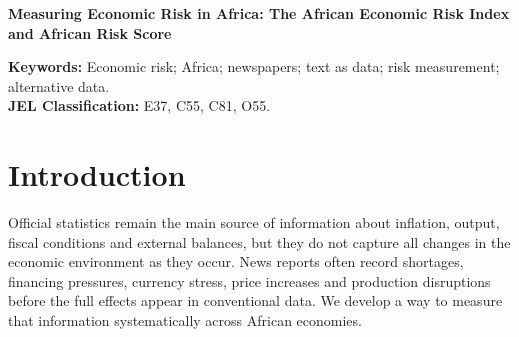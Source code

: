 \documentclass[12pt]{article}
\begin{document}
\begin{titlepage}\thispagestyle{plain}
\begin{center}
{\Large\bfseries Measuring Economic Risk in Africa: The African Economic Risk Index and African Risk Score\par}
\end{center}
\vspace{.35cm}
\begin{abstract}\singlespacing
We construct news-based measures of economic risk for 54 African economies from 2015 to 2025. The African Economic Risk Index (AERI) assigns graded scores to articles according to economic relevance, severity and textual emphasis and averages those scores over the monthly news flow. Eight non-exclusive pillar indices retain the domain information. The African Risk Score (ARS) maps bounded measures of AERI intensity, relevant-article breadth, average severity and active-domain count to a 0--100 scale. The data contain 21.30 million retained article records and 6,488 country-months that meet the principal descriptive coverage threshold. Exact-text deduplication removes 497,091 repeated records (2.33 percent) from the reconstructed frozen vintage; original and duplicate-adjusted AERI remain highly correlated (Pearson 0.9296; rank 0.9883). Aggregate AERI peaks in April 2020, but country histories differ in timing and composition. Alternative ARS weights produce closely aligned scores. In pooled panel VARs, inflation-risk readings precede higher headline inflation, exchange-rate depreciation is followed by higher AERI, and stronger real activity is followed by lower AERI. An external monetary-policy design also shows larger subsequent AERI increases after U.S. tightening shocks in economies with greater predetermined external-debt exposure. The reported sensitivity and falsification checks do not materially change these findings. AERI, the pillar indices and ARS are decomposable measures of reported economic risk that can be read alongside conventional macroeconomic statistics.
\end{abstract}
\noindent\small\textbf{Keywords:} Economic risk; Africa; newspapers; text as data; risk measurement; alternative data.\\
\textbf{JEL Classification:} E37, C55, C81, O55.
\end{titlepage}

\section{Introduction}\label{sec:introduction}
Official statistics remain the main source of information about inflation, output, fiscal conditions and external balances, but they do not capture all changes in the economic environment as they occur. News reports often record shortages, financing pressures, currency stress, price increases and production disruptions before the full effects appear in conventional data. We develop a way to measure that information systematically across African economies.
\end{document}
